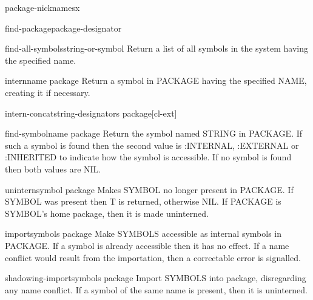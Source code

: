 \documentclass[10pt,english]{book}
\begin{document}
\begin{function}{package-nicknames}{x}
  
\end{function}

\begin{function}{find-package}{package-designator}
  
\end{function}

\begin{function}{find-all-symbols}{string-or-symbol}
  Return a list of all symbols in the system having the specified name.
\end{function}

\begin{function}{intern}{name \op package}
  Return a symbol in PACKAGE having the specified NAME, creating it
  if necessary.
\end{function}

\begin{function}{intern-concat}{string-designators \op package}[cl-ext]
  
\end{function}

\begin{function}{find-symbol}{name \op package}
  Return the symbol named STRING in PACKAGE. If such a symbol is found
  then the second value is :INTERNAL, :EXTERNAL or :INHERITED to indicate
  how the symbol is accessible. If no symbol is found then both values
  are NIL.
\end{function}

\begin{function}{unintern}{symbol \op package}
  Makes SYMBOL no longer present in PACKAGE. If SYMBOL was present then T is
returned, otherwise NIL. If PACKAGE is SYMBOL's home package, then it is made
uninterned.
\end{function}

\begin{function}{import}{symbols \op package}
  Make SYMBOLS accessible as internal symbols in PACKAGE. If a symbol is
already accessible then it has no effect. If a name conflict would result from
the importation, then a correctable error is signalled.
\end{function}

\begin{function}{shadowing-import}{symbols \op package}
  Import SYMBOLS into package, disregarding any name conflict. If
  a symbol of the same name is present, then it is uninterned.
\end{function}
\end{document}
